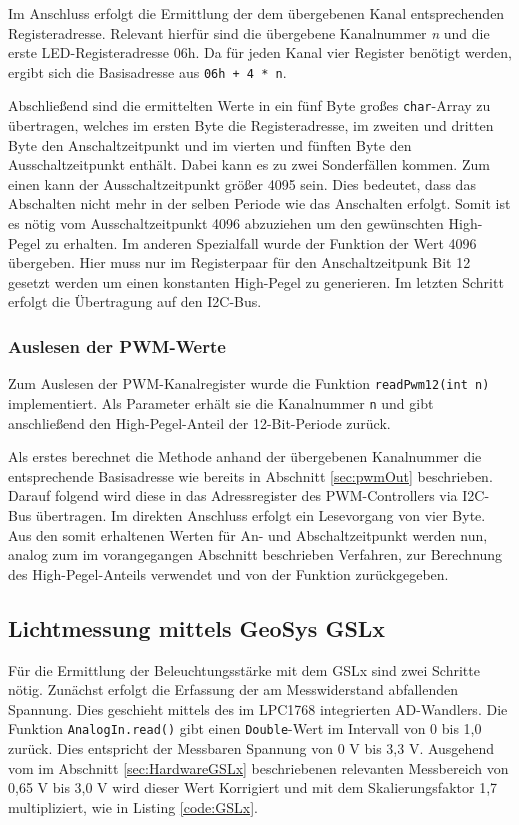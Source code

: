 \documentclass[a4paper,12pt]{scrartcl}
\begin{document}
Im Anschluss erfolgt die Ermittlung der dem übergebenen Kanal entsprechenden Registeradresse. Relevant hierfür sind die übergebene Kanalnummer \textit{n} und die erste LED-Registeradresse 06h. Da für jeden Kanal vier Register benötigt werden, ergibt sich die Basisadresse aus \texttt{06h + 4 * n}.

Abschließend sind die ermittelten Werte in ein fünf Byte großes \texttt{char}-Array zu übertragen, welches im ersten Byte die Registeradresse, im zweiten und dritten Byte den Anschaltzeitpunkt und im vierten und fünften Byte den Ausschaltzeitpunkt enthält. Dabei kann es zu zwei Sonderfällen kommen. Zum einen kann der Ausschaltzeitpunkt größer 4095 sein. Dies bedeutet, dass das Abschalten nicht mehr in der selben Periode wie das Anschalten erfolgt. Somit ist es nötig vom Ausschaltzeitpunkt 4096 abzuziehen um den gewünschten High-Pegel zu erhalten. Im anderen Spezialfall wurde der Funktion der Wert 4096 übergeben. Hier muss nur im Registerpaar für den Anschaltzeitpunk Bit 12 gesetzt werden um einen konstanten High-Pegel zu generieren. Im letzten Schritt erfolgt die Übertragung auf den I2C-Bus.


\subsubsection{Auslesen der PWM-Werte}
Zum Auslesen der PWM-Kanalregister wurde die Funktion \texttt{readPwm12(int n)} implementiert. Als Parameter erhält sie die Kanalnummer \texttt{n} und gibt anschließend den High-Pegel-Anteil der 12-Bit-Periode zurück.

Als erstes berechnet die Methode anhand der übergebenen Kanalnummer die entsprechende Basisadresse wie bereits in Abschnitt \ref{sec:pwmOut} beschrieben. Darauf folgend wird diese in das Adressregister des PWM-Controllers via I2C-Bus übertragen. Im direkten Anschluss erfolgt ein Lesevorgang von vier Byte. Aus den somit erhaltenen Werten für An- und Abschaltzeitpunkt werden nun, analog zum im vorangegangen Abschnitt beschrieben Verfahren, zur Berechnung des High-Pegel-Anteils verwendet und von der Funktion zurückgegeben.

\subsection{Lichtmessung mittels GeoSys GSLx}
\label{sec:impGSLx}
Für die Ermittlung der Beleuchtungsstärke mit dem GSLx sind zwei Schritte nötig. Zunächst erfolgt die Erfassung der am Messwiderstand abfallenden Spannung. Dies geschieht mittels des im LPC1768 integrierten AD-Wandlers. Die Funktion \texttt{AnalogIn.read()} gibt einen \texttt{Double}-Wert im Intervall von 0 bis 1,0 zurück. Dies entspricht der Messbaren Spannung von 0 V bis 3,3 V. Ausgehend vom im Abschnitt \ref{sec:HardwareGSLx} beschriebenen relevanten Messbereich von 0,65 V bis 3,0 V wird dieser Wert Korrigiert und mit dem Skalierungsfaktor 1,7 multipliziert, wie in Listing \ref{code:GSLx}.
\end{document}
